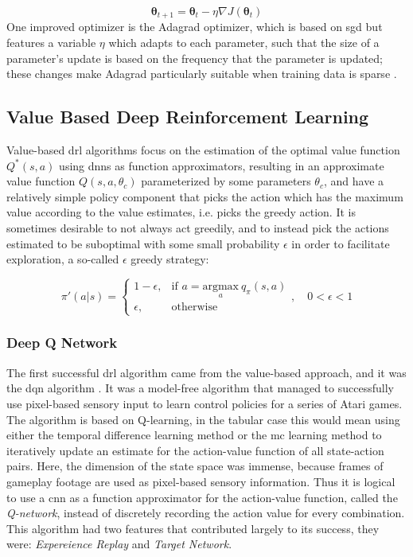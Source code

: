 \documentclass[../report.tex]{subfiles}
\begin{document}
\begin{equation}
    \boldsymbol{\theta}_{t+1} = \boldsymbol{\theta}_t - \eta \nabla J(\boldsymbol{\theta}_t)
\end{equation}
One improved optimizer is the Adagrad optimizer, which is based on \ac{sgd} but features a variable $\eta$ which adapts to each parameter, such that the size of a parameter's update is based on the frequency that the parameter is updated; these changes make Adagrad particularly suitable when training data is sparse \cite{gradient_optimizers}.


\subsection{Value Based Deep Reinforcement Learning}\label{subsec:value_based_drl}

Value-based \ac{drl} algorithms focus on the estimation of the optimal value function $Q^*(s,a)$ using \acp{dnn} as function approximators, resulting in an approximate value function $Q(s,a,\theta_c)$ parameterized by some parameters $\theta_c$, and have a relatively simple policy component that picks the action which has the maximum value according to the value estimates, i.e. picks the greedy action. It is sometimes desirable to not always act greedily, and to instead pick the actions estimated to be suboptimal with some small probability $\epsilon$ in order to facilitate exploration, a so-called $\epsilon$ greedy strategy: 

\begin{equation}
    \pi'(a|s) = \begin{cases}
    1-\epsilon,& \text{if } a = \underset{a}{\text{argmax}} \ q_{\pi}(s,a) \\
    \epsilon ,              & \text{otherwise}
    \end{cases}, \quad 0 < \epsilon < 1
\end{equation}


\subsubsection{Deep Q Network}
The first successful \ac{drl} algorithm came from the value-based approach, and it was the \ac{dqn} algorithm \cite{dqn}. It was a model-free algorithm that managed to successfully use pixel-based sensory input to learn control policies for a series of Atari games. The algorithm is based on Q-learning, in the tabular case this would mean using either the temporal difference learning method or the \ac{mc} learning method to iteratively update an estimate for the action-value function of all state-action pairs. Here, the dimension of the state space was immense, because frames of gameplay footage are used as pixel-based sensory information. Thus it is logical to use a \ac{cnn} as a function approximator for the action-value function, called the \textit{Q-network}, instead of discretely recording the action value for every combination. This algorithm had two features that contributed largely to its success, they were: \textit{Expereience Replay} and \textit{Target Network}. 
\end{document}
